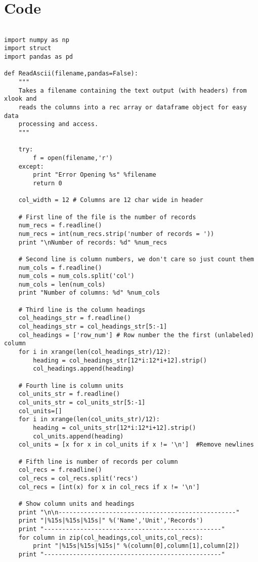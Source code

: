 \section{Code}
\begin{lstlisting}

import numpy as np
import struct
import pandas as pd

def ReadAscii(filename,pandas=False):
    """
    Takes a filename containing the text output (with headers) from xlook and
    reads the columns into a rec array or dataframe object for easy data 
    processing and access.
    """

    try:
        f = open(filename,'r')
    except:
        print "Error Opening %s" %filename
        return 0
    
    col_width = 12 # Columns are 12 char wide in header
    
    # First line of the file is the number of records
    num_recs = f.readline()
    num_recs = int(num_recs.strip('number of records = '))
    print "\nNumber of records: %d" %num_recs
    
    # Second line is column numbers, we don't care so just count them
    num_cols = f.readline()
    num_cols = num_cols.split('col')
    num_cols = len(num_cols)
    print "Number of columns: %d" %num_cols
    
    # Third line is the column headings
    col_headings_str = f.readline()
    col_headings_str = col_headings_str[5:-1]
    col_headings = ['row_num'] # Row number the the first (unlabeled) column
    for i in xrange(len(col_headings_str)/12):
        heading = col_headings_str[12*i:12*i+12].strip()
        col_headings.append(heading)

    # Fourth line is column units
    col_units_str = f.readline()
    col_units_str = col_units_str[5:-1]
    col_units=[]
    for i in xrange(len(col_units_str)/12):
        heading = col_units_str[12*i:12*i+12].strip()
        col_units.append(heading)
    col_units = [x for x in col_units if x != '\n']  #Remove newlines
    
    # Fifth line is number of records per column
    col_recs = f.readline()
    col_recs = col_recs.split('recs')
    col_recs = [int(x) for x in col_recs if x != '\n']
    
    # Show column units and headings
    print "\n\n-------------------------------------------------"
    print "|%15s|%15s|%15s|" %('Name','Unit','Records')
    print "-------------------------------------------------"
    for column in zip(col_headings,col_units,col_recs):
        print "|%15s|%15s|%15s|" %(column[0],column[1],column[2])
    print "-------------------------------------------------"
    

\end{lstlisting}
